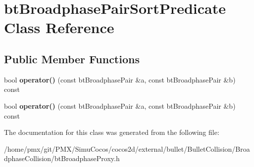 \hypertarget{classbtBroadphasePairSortPredicate}{}\section{bt\+Broadphase\+Pair\+Sort\+Predicate Class Reference}
\label{classbtBroadphasePairSortPredicate}
\subsection*{Public Member Functions}
\begin{DoxyCompactItemize}
\item 
\mbox{\label{classbtBroadphasePairSortPredicate_acb65f61121ba0215a482ac66472499a4}} 
bool {\bfseries operator()} (const bt\+Broadphase\+Pair \&a, const bt\+Broadphase\+Pair \&b) const
\item 
\mbox{\label{classbtBroadphasePairSortPredicate_acb65f61121ba0215a482ac66472499a4}} 
bool {\bfseries operator()} (const bt\+Broadphase\+Pair \&a, const bt\+Broadphase\+Pair \&b) const
\end{DoxyCompactItemize}


The documentation for this class was generated from the following file\+:\begin{DoxyCompactItemize}
\item 
/home/pmx/git/\+P\+M\+X/\+Simu\+Cocos/cocos2d/external/bullet/\+Bullet\+Collision/\+Broadphase\+Collision/bt\+Broadphase\+Proxy.\+h\end{DoxyCompactItemize}
